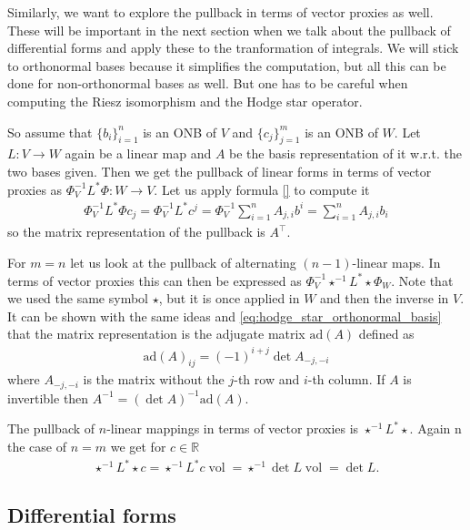 \documentclass[12pt,a4paper]{article}
\numberwithin{equation}{subsection}
\numberwithin{lemma}{subsection}
\theoremstyle{definition}
\DeclareMathOperator{\vol}{vol}
\newcommand{\real}{\mathbb{R}}
\begin{document}
Similarly, we want to explore the pullback in terms of vector proxies as well. 
These will be important in the next section when we talk about the pullback 
of differential forms and apply these to the tranformation of integrals.
We will stick to orthonormal bases because it simplifies the computation, 
but all this can be done for non-orthonormal bases as well. But one has to be 
careful when computing the Riesz isomorphism and the Hodge star operator. 

So assume that $\{ b_i \}_{i=1}^n$ is an ONB of $V$ and 
$\{ c_j \}_{j=1}^m$ is an ONB of $W$. Let $L : V \rightarrow W$ 
again be a linear map and $A$ be the basis representation of it w.r.t. 
the two bases given. Then we get the pullback of linear forms in terms 
of vector proxies 
as $\Phi_V^{-1} L^* \Phi : W \rightarrow V$. Let us apply 
formula \ref{} to compute it
\begin{align*}
    \Phi_V^{-1} L^* \Phi c_j = \Phi_V^{-1} L^* c^j 
    = \Phi_V^{-1} \sum_{i=1}^n A_{j,i} b^i = \sum_{i=1}^n A_{j,i} b_i
\end{align*}
so the matrix representation of the pullback is $A^\top$. 

For $m=n$ let us look at the pullback of alternating $(n-1)$-linear maps.
In terms of vector proxies this can then be expressed as 
$\Phi_V^{-1} \star^{-1} L^* \star \Phi_W$. Note that we used the same symbol 
$\star$, but it is once applied in $W$ and then the inverse in $V$. It 
can be shown with the same ideas and \ref{eq:hodge_star_orthonormal_basis}
that the matrix representation is the adjugate matrix 
$\text{ad}(A)$ defined as 
\begin{align*}
    \text{ad}(A)_{ij} = (-1)^{i+j} \det A_{-j,-i}
\end{align*} 
where $A_{-j,-i}$ is the matrix without the $j$-th row and $i$-th column.
If $A$ is invertible then $A^{-1} = (\det A)^{-1} \text{ad}(A)$. 

The pullback of $n$-linear mappings in terms of vector proxies is 
$\star^{-1} L^* \star$. Again n the case of $n=m$ we get for $c \in \real$
\begin{align*}
    \star^{-1} L^* \star c = \star^{-1} L^* c \vol 
    = \star^{-1} \det L \vol = \det L.
\end{align*}

\subsection{Differential forms}\label{sec:differential_forms}
\end{document}
